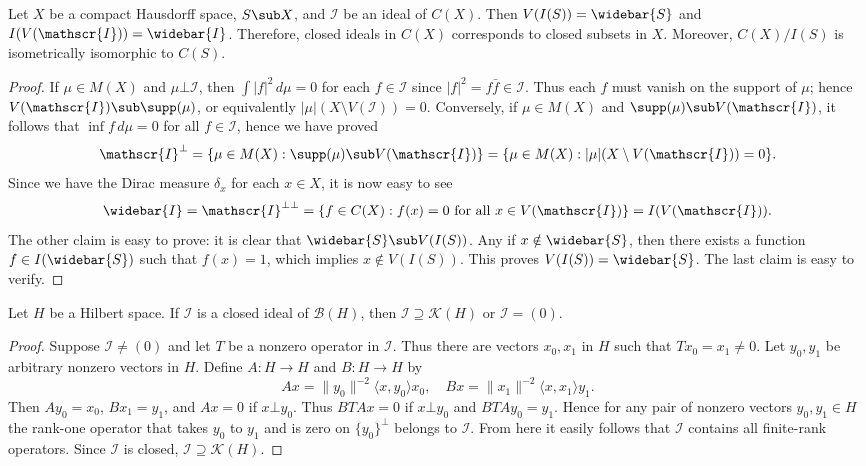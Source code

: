\begin{theorem}\label{closed ideal in C(X)}
Let $X$ be a compact Hausdorff space, $S\sub X$, and $\mathscr{I}$ be an ideal of $C(X)$. Then $V(I(S))=\widebar{S}$ and $I(V(\mathscr{I}))=\widebar{I}$. Therefore, closed ideals in $C(X)$ corresponds to closed subsets in $X$. Moreover, $C(X)/I(S)$ is isometrically isomorphic to $C(S)$.
\end{theorem}
\begin{proof}
If $\mu\in M(X)$ and $\mu\bot\mathscr{I}$, then $\int|f|^2\,d\mu=0$ for each $f\in\mathscr{I}$ since $|f|^2=f\bar{f}\in\mathscr{I}$. Thus each $f$ must vanish on the support of $\mu$; hence $V(\mathscr{I})\sub\supp(\mu)$, or equivalently $|\mu|(X\setminus V(\mathscr{I}))=0$. Conversely, if $\mu\in M(X)$ and $\supp(\mu)\sub V(\mathscr{I})$, it follows that $\inf f\,d\mu=0$ for all $f\in\mathscr{I}$, hence we have proved
\[\mathscr{I}^\bot=\{\mu\in M(X):\supp(\mu)\sub V(\mathscr{I})\}=\{\mu\in M(X):|\mu|(X\setminus V(\mathscr{I}))=0\}.\]
Since we have the Dirac measure $\delta_x$ for each $x\in X$, it is now easy to see
\[\widebar{I}=\mathscr{I}^{\bot\bot}=\{f\in C(X):f(x)=0\text{ for all $x\in V(\mathscr{I})$}\}=I(V(\mathscr{I})).\]
The other claim is easy to prove: it is clear that $\widebar{S}\sub V(I(S))$. Any if $x\notin\widebar{S}$, then there exists a function $f\in I(\widebar{S})$ such that $f(x)=1$, which implies $x\notin V(I(S))$. This proves $V(I(S))=\widebar{S}$. The last claim is easy to verify.
\end{proof}
\begin{proposition}\label{Hilbert space nonzero closed ideal}
Let $H$ be a Hilbert space. If $\mathscr{I}$ is a closed ideal of $\mathcal{B}(H)$, then $\mathscr{I}\supseteq\mathcal{K}(H)$ or $\mathscr{I}=(0)$.
\end{proposition}
\begin{proof}
Suppose $\mathscr{I}\neq(0)$ and let $T$ be a nonzero operator in $\mathscr{I}$. Thus there are vectors $x_0,x_1$ in $H$ such that $Tx_0=x_1\neq 0$. Let $y_0,y_1$ be arbitrary nonzero vectors in $H$. Define $A:H\to H$ and $B:H\to H$ by
\[Ax=\|y_0\|^{-2}\langle x,y_0\rangle x_0,\quad Bx=\|x_1\|^{-2}\langle x,x_1\rangle y_1.\]
Then $Ay_0=x_0$, $Bx_1=y_1$, and $Ax=0$ if $x\bot y_0$. Thus $BTAx=0$ if $x\bot y_0$ and $BTAy_0=y_1$. Hence for any pair of nonzero vectors $y_0,y_1\in H$ the rank-one operator that takes $y_0$ to $y_1$ and is zero on $\{y_0\}^\bot$ belongs to $\mathscr{I}$. From here it easily follows that $\mathscr{I}$ contains all finite-rank operators. Since $\mathscr{I}$ is closed, $\mathscr{I}\supseteq\mathcal{K}(H)$.
\end{proof}
